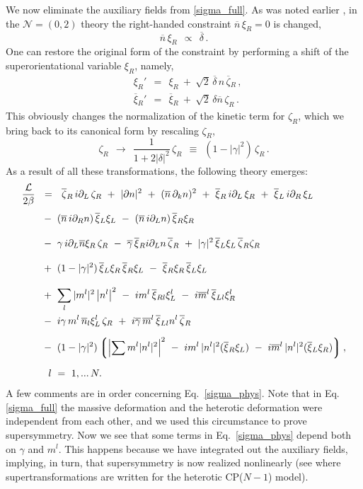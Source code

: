 \documentclass[12pt]{article}
\newcommand{\ntwoo}{${\mathcal N}= \left(0,2\right) $ }
\newcommand{\p}{\partial}
\newcommand{\ov}{\overline}
\newcommand{\mc}[1]{\mathcal{#1}}
\newcommand{\lgr}{\left\lgroup}
\newcommand{\rgr}{\right\rgroup}
\newcommand{\bxir}{\ov{\xi}{}_R}
\newcommand{\bxil}{\ov{\xi}{}_L}
\newcommand{\xir}{\xi_R}
\newcommand{\xil}{\xi_L}
\newcommand{\bzr}{\ov{\zeta}{}_R}
\newcommand{\zr}{\zeta_R}
\newcommand{\nbar}{\ov{n}}
\begin{document}
        We now eliminate the auxiliary fields from \eqref{sigma_full}. 
        As was noted earlier \cite{Edalati}, in the \ntwoo theory the right-handed constraint $ \nbar\,\xir = 0 $ is
changed,
\[
	\nbar\, \xir ~~\propto~~ \ov{\delta}\,.
\]
One can restore the original form of 
the constraint  by performing a shift of the superorientational variable $ \xir $, namely,
\begin{align*}
%
	& \xi_R' ~~=~~ \xir ~+~ \sqrt{2}\, \ov{\delta}\, n\, \bzr \,, \\[1mm]
%
	& \ov{\xi}{}_R' ~~=~~ \bxir ~+~ \sqrt{2}\, \delta \nbar\, \zr\,.
\end{align*}
	This obviously changes the normalization of the kinetic term for $ \zr $, which we
	bring back to its canonical form by rescaling $ \zr $,
\[
	\zr ~~\to~~ \frac{1}{1 + 2|\delta|^2}\,\zr ~~\equiv~~ ( 1 - |\gamma|^2 )\, \zr\,.
\]
As a result of all these transformations,  the following theory emerges:
\begin{align}
%
\notag
	\frac{\mc{L}}{2\beta} & ~~=~~ \bzr\, i\p_L\, \zr ~+~ 
		| \p n |^2  ~+~ (\nbar\, \p_k n)^2 ~+~ \bxir\, i\p_L\, \xir ~+~ \bxil\, i\p_R\, \xil
	\\[1mm]
%
\notag
	&~ 
	~-~ (\nbar\, i\p_R n)\, \bxil \xil ~-~  (\nbar\, i\p_L n)\, \bxir \xir
	\\[3mm]
%
\notag
	&~
	~-~ \gamma\, i\p_L\nbar \xir\, \zr ~-~ \ov{\gamma}\, \bxir i\p_L n\, \bzr
	~+~ |\gamma|^2\, \bxil \xil\, \bzr \zr
	\\[3mm]
%
\label{sigma_phys}
	&~
	~+~ (1-|\gamma|^2)\,\bxil\xir\,\bxir\xil ~-~ \bxir\xir\,\bxil\xil
	\\[3mm]
%	
\notag
	&~
	~+~ \sum_l |m^l|^2 \left|n^l \right|^2 
	~-~ i m^l\, \ov{\xi}{}_{Rl} \xi_L^l ~-~ i\ov{m}{}^l\, \ov{\xi}{}_{Ll} \xi_R^l
	\\
%
\notag
	&~
	~-~ i\gamma\, m^l\, \ov{n}{}_l \xi_L^l\, \zr 
	~+~ i\ov{\gamma}\, \ov{m}{}^l\, \ov{\xi}{}_{Ll} n^l\, \bzr
	\\[2mm]
%
\notag
	&~
	~-~ (1-|\gamma|^2)
	\lgr \left|\sum m^l |n^l|^2 \right|^2 
		~-~ i m^l\, |n^l|^2 (\bxir\xil) ~-~ i\ov{m}{}^l\, |n^l|^2(\bxil\xir)
	\rgr ,
	\\[2mm]
%
\notag
	&
	~~~~  l ~=~ 1,...\,N.
\end{align}	
	A few comments are in order concerning Eq.~\eqref{sigma_phys}. 
	Note that in Eq. \eqref{sigma_full} the massive deformation and the heterotic deformation
	were independent from each other, and we used this
	circumstance to prove supersymmetry.
	Now we see that some terms in Eq.~\eqref{sigma_phys}  depend both on $\gamma$ and
	$m^l$.
	This happens because we have integrated out the auxiliary fields, implying, in turn,  
 that supersymmetry is now realized nonlinearly 
	(see \cite{BSYhet} where supertransformations are written for the
	heterotic CP($N-1$) model).
\end{document}
